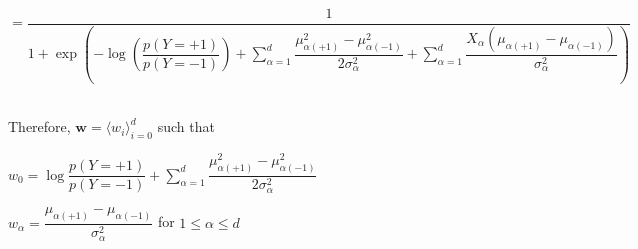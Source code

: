\documentclass{article}
\begin{document}
\begin{enumerate}[label=(\alph*)]
\begin{center}$=\dfrac{1}
{1 + \exp\left(-\log\left(\dfrac{p(Y=+1)}{p(Y=-1)}\right) + 
\sum_{\alpha=1}^{d}\dfrac{\mu_{\alpha(+1)}^2 - \mu_{\alpha(-1)}^2}{2\sigma_\alpha^2}
+ \sum_{\alpha=1}^{d}\dfrac{X_\alpha(\mu_{\alpha(+1)} - \mu_{\alpha(-1)})}{\sigma_\alpha^2}\right)}$\end{center} \ \\

Therefore, $\mathbf{w} = \langle w_i \rangle_{i=0}^{d}$ such that
\begin{center}$w_0 = \log\dfrac{p(Y = +1)}{p(Y = -1)} + \sum_{\alpha=1}^{d}\dfrac{\mu_{\alpha(+1)}^2 - \mu_{\alpha(-1)}^2}{2\sigma_\alpha^2}$ \end{center}
\begin{center}$w_\alpha = \dfrac{\mu_{\alpha(+1)} - \mu_{\alpha(-1)}}{\sigma_\alpha^2}$ for $1 \leq \alpha \leq d$\end{center} \ \\

\end{enumerate}



\end{document}

